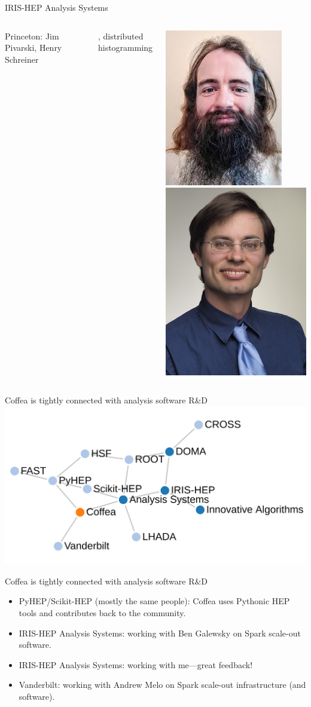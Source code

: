 \documentclass[aspectratio=169]{beamer}
\begin{document}
\begin{frame}{IRIS-HEP Analysis Systems}
\begin{columns}[t]
\vspace{0.5 cm}
{\large Princeton: Jim Pivarski, Henry Schreiner}

, distributed histogramming

\vspace{0.2 cm}
\includegraphics[height=1.5 cm]{Jim-Pivarski.jpg}
\includegraphics[height=1.5 cm]{Henry-Schreiner.jpg}

\end{columns}
\end{frame}

\begin{frame}{Coffea is tightly connected with analysis software R\&D}
\vspace{0.5 cm}
\includegraphics[width=\linewidth]{analysis-connections.png}
\end{frame}

\begin{frame}{Coffea is tightly connected with analysis software R\&D}
\large
\vspace{0.5 cm}
\begin{itemize}\setlength{\itemsep}{0.5 cm}
\item PyHEP/Scikit-HEP (mostly the same people): Coffea uses Pythonic HEP tools and contributes back to the community.
\item IRIS-HEP Analysis Systems: working with Ben Galewsky on Spark scale-out software.
\item IRIS-HEP Analysis Systems: working with me---great feedback!
\item Vanderbilt: working with Andrew Melo on Spark scale-out infrastructure (and software).
\end{itemize}
\end{frame}
\end{document}
